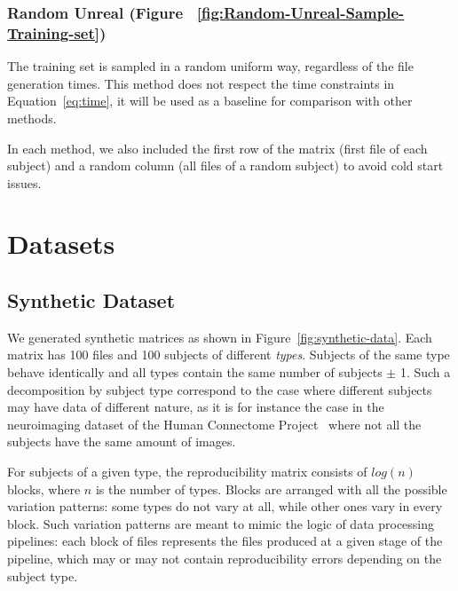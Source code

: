 \documentclass[10pt, conference, compsocconf]{IEEEtran}
\begin{document}
\subsubsection{Random Unreal (Figure 
~\ref{fig:Random-Unreal-Sample-Training-set})} The training set is 
sampled in a random uniform way, regardless of the file generation 
times. This method does not respect the time constraints in 
Equation~\ref{eq:time}, it will be used as a baseline for comparison 
with other methods.

In each method, we also included the first row of the matrix (first 
 file of each subject) and a random column (all files of a 
random subject) to avoid cold start issues. 


\section{Datasets}

\label{sec:datasets}

\subsection{Synthetic Dataset}

We generated synthetic matrices as shown in 
Figure~\ref{fig:synthetic-data}. Each matrix has 100 files and 100 
subjects of different \emph{types}. Subjects of the same type behave 
identically and all types contain the same number of subjects $\pm$ 1. 
Such a decomposition by subject type correspond to the case where 
different subjects may have data of different nature, as it is for 
instance the case in the neuroimaging 
dataset of the Human Connectome Project~\cite{van2013wu} where not all the 
subjects have the same amount of images.

 For subjects of a given type, the reproducibility matrix consists of 
 $log(n)$  blocks, where $n$ is the number of types. Blocks are 
 arranged with all the possible variation patterns: some types do not 
 vary at all, while other ones vary in every block. Such variation 
 patterns are meant to mimic the logic of data 
processing pipelines: each block of files represents the files produced 
at a given stage of the pipeline, which may or may not contain 
reproducibility errors depending on the subject type.
\end{document}
